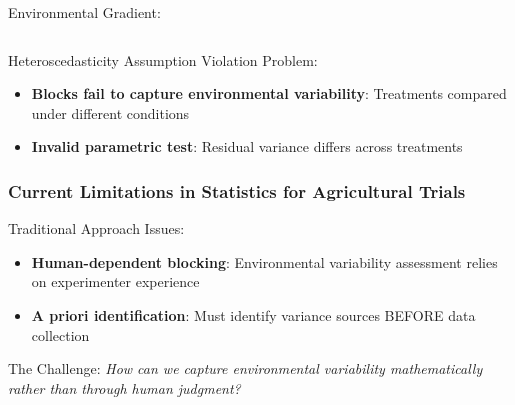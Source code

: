 \documentclass[aspectratio=43]{beamer}
\begin{document}
\begin{frame}
\begin{columns}
\begin{column}{0.3\textwidth}
\begin{block}{\small Environmental Gradient:}
            \end{block}
        \end{column}
    \end{columns}
    
    \begin{alertblock}{\small Heteroscedasticity Assumption Violation Problem:}
        \scriptsize
        \begin{itemize}
            \item \textbf{Blocks fail to capture environmental variability}: Treatments compared under different conditions
            \item \textbf{Invalid parametric test}: Residual variance differs across treatments
        \end{itemize}
    \end{alertblock}
\end{frame}

\begin{frame}
    \frametitle{Current Limitations in Statistics for Agricultural Trials}
    
    \begin{block}{Traditional Approach Issues:}
        \begin{itemize}
            \item \textbf{Human-dependent blocking}: Environmental variability assessment relies on experimenter experience
            \item \textbf{A priori identification}: Must identify variance sources BEFORE data collection
        \end{itemize}
    \end{block}
    
    \begin{alertblock}{The Challenge:}
        \textit{How can we capture environmental variability mathematically rather than through human judgment?}
    \end{alertblock}
\end{frame}
\end{document}
